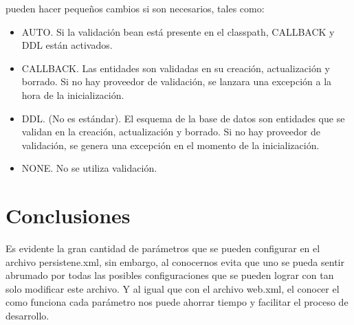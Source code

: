 \documentclass[a4paper,12pt]{article}
\begin{document}
\begin{itemize}
pueden hacer pequeños cambios si son necesarios, tales como:
\begin{itemize}
 \item AUTO. Si la validación bean está presente en el classpath, CALLBACK y 
DDL están activados.
 \item CALLBACK. Las entidades son validadas en su creación, actualización y 
borrado. Si no hay proveedor de validación, se lanzara una excepción a la hora 
de la inicialización.
 \item DDL. (No es estándar). El esquema de la base de datos son entidades que 
se validan en la creación, actualización y borrado. Si no hay proveedor de 
validación, se genera una excepción en el momento de la inicialización.
 \item NONE. No se utiliza validación.
\end{itemize}

\end{itemize}

\section{Conclusiones}
Es evidente la gran cantidad de parámetros que se pueden configurar en el 
archivo persistene.xml, sin embargo, al conocernos evita que uno se pueda 
sentir abrumado por todas las posibles configuraciones que se pueden lograr con 
tan solo modificar este archivo. Y al igual que con el archivo web.xml, el 
conocer el como funciona cada parámetro nos puede ahorrar tiempo y facilitar el 
proceso de desarrollo.
\end{document}
